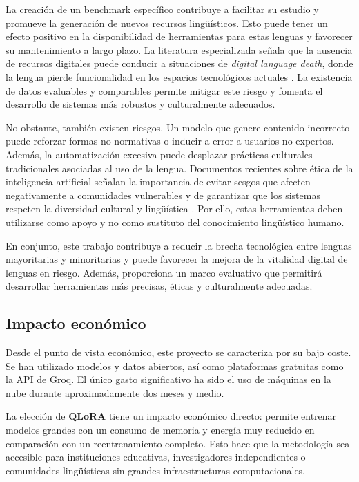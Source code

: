 La creación de un benchmark específico contribuye a facilitar su estudio y promueve la generación de nuevos recursos lingüísticos. Esto puede tener un efecto positivo en la disponibilidad de herramientas para estas lenguas y favorecer su mantenimiento a largo plazo. La literatura especializada señala que la ausencia de recursos digitales puede conducir a situaciones de \textit{digital language death}, donde la lengua pierde funcionalidad en los espacios tecnológicos actuales \cite{moseley_2012_digital}. La existencia de datos evaluables y comparables permite mitigar este riesgo y fomenta el desarrollo de sistemas más robustos y culturalmente adecuados.

No obstante, también existen riesgos. Un modelo que genere contenido incorrecto puede reforzar formas no normativas o inducir a error a usuarios no expertos. Además, la automatización excesiva puede desplazar prácticas culturales tradicionales asociadas al uso de la lengua. Documentos recientes sobre ética de la inteligencia artificial señalan la importancia de evitar sesgos que afecten negativamente a comunidades vulnerables y de garantizar que los sistemas respeten la diversidad cultural y lingüística \cite{unesco_ai_2021}. Por ello, estas herramientas deben utilizarse como apoyo y no como sustituto del conocimiento lingüístico humano.

En conjunto, este trabajo contribuye a reducir la brecha tecnológica entre lenguas mayoritarias y minoritarias y puede favorecer la mejora de la vitalidad digital de lenguas en riesgo. Además, proporciona un marco evaluativo que permitirá desarrollar herramientas más precisas, éticas y culturalmente adecuadas.


\subsection{Impacto económico}

Desde el punto de vista económico, este proyecto se caracteriza por su bajo coste. Se han utilizado modelos y datos abiertos, así como plataformas gratuitas como la API de Groq. El único gasto significativo ha sido el uso de máquinas en la nube durante aproximadamente dos meses y medio.

La elección de \textbf{QLoRA} tiene un impacto económico directo: permite entrenar modelos grandes con un consumo de memoria y energía muy reducido en comparación con un reentrenamiento completo. Esto hace que la metodología sea accesible para instituciones educativas, investigadores independientes o comunidades lingüísticas sin grandes infraestructuras computacionales.

